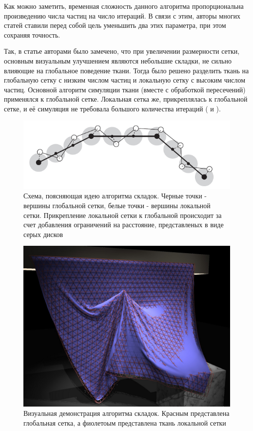 	Как можно заметить, временная сложность данного алгоритма пропорциональна произведению числа частиц на число итераций. В связи с этим, авторы многих статей ставили перед собой цель уменьшить два этих параметра, при этом сохраняя точность.
	
	Так, в статье \cite{muller2010wrinkle} авторами было замечено, что при увеличении размерности сетки, основным визуальным улучшением являются небольшие складки, не сильно влияющие на глобальное поведение ткани. Тогда было решено разделить ткань на глобальную сетку с низким числом частиц и локальную сетку с высоким числом частиц. Основной алгоритм симуляции ткани (вместе с обработкой пересечений) применялся к глобальной сетке. Локальная сетка же, прикреплялась к глобальной сетке, и её симуляция не требовала большого количества итераций ( и ).

	\begin{figure}[ht!] 
		\center
		\includegraphics [scale=0.8] {my_folder/images//wrincle_mesh_idea}
		\caption{Схема, поясняющая идею алгоритма складок. Черные точки - вершины глобальной сетки, белые точки - вершины локальной сетки. Прикрепление локальной сетки к глобальной происходит за счет добавления ограничений на расстояние, представленых в виде серых дисков}
		\label{fig:wrincle-idea}  
	\end{figure}
	
		
	\begin{figure}[ht!] 
		\center
		\includegraphics [scale=0.5] {my_folder/images//wrincle_mesh_show}
		\caption{Визуальная демонстрация алгоритма складок. Красным представлена глобальная сетка, а фиолетоым представлена ткань локальной сетки}
		\label{fig:wrincle-show}  
	\end{figure}
	
